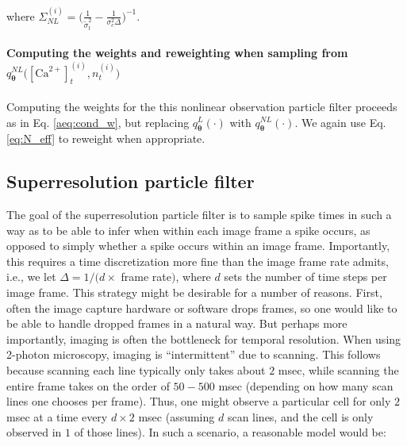 \documentclass[10pt]{article}
\providecommand{\ve}[1]{\boldsymbol{#1}}
\providecommand{\ve}[1]{\boldsymbol{#1}}
\newcommand{\thetn}{\ve{\theta}}
\newcommand{\Ca}{[\text{Ca}^{2+}]}
\begin{document}
\noindent where $\Sigma_{NL}^{(i)}= \big(\frac{1}{\widetilde{\sigma}_t^2} - \frac{1}{\sigma_c^2 \Delta}\big)^{-1}$. 

\paragraph{Computing the weights and reweighting when sampling from $q_{\thetn}^{NL}\big(\Ca_t^{(i)}, n_t^{(i)}\big)$}

Computing the weights for the this nonlinear observation particle filter proceeds as in Eq. \ref{aeq:cond_w}, but replacing $q_{\thetn}^L(\cdot)$ with $q_{\thetn}^{NL}(\cdot)$. We again use Eq. \ref{eq:N_eff} to reweight when appropriate.

%
%
%
%

\subsection{Superresolution particle filter} \label{sec:SNOOPSI}

The goal of the superresolution particle filter is to sample spike times in such a way as to be able to infer when within each image frame a spike occurs, as opposed to simply whether a spike occurs within an image frame.  Importantly, this requires a time discretization more fine than the image frame rate admits, i.e., we let $\Delta=1/(d \times$ frame rate$)$, where $d$ sets the number of time steps per image frame. This strategy might be desirable for a number of reasons.  First, often the image capture hardware or software drops frames, so one would like to be able to handle dropped frames in a natural way.  But perhaps more importantly, imaging is often the bottleneck for temporal resolution.  When using 2-photon microscopy, imaging is ``intermittent'' due to scanning. This follows because scanning each line typically only takes about $2$ msec, while scanning the entire frame takes on the order of $50-500$ msec (depending on how many scan lines one chooses per frame). Thus, one might observe a particular cell for only $2$ msec at a time every $d \times 2$ msec (assuming $d$ scan lines, and the cell is only observed in $1$ of those lines).  In such a scenario, a reasonable model would be:
\end{document}
